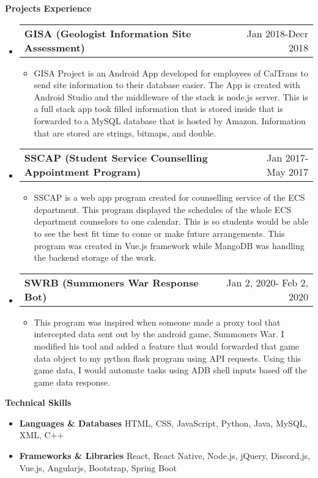 \documentclass[letterpaper,12pt]{article}[leftmargin=*]
\makeatletter
\def \entryspacing {-0pt}
\renewcommand{\section}[2]{\vspace{5pt}
  \colorbox{secondary}{\color{white}\raggedbottom\normalsize\textbf{{#1}{\hspace{7pt}#2}}}
}
\newcommand{\resumeEntryStart}{\begin{itemize}[leftmargin=2.5mm]}
\newcommand{\resumeEntryEnd}{\end{itemize}\vspace{\entryspacing}}
\newcommand{\resumeItemListStart}{\begin{itemize}[leftmargin=4.5mm]}
\newcommand{\resumeItemListEnd}{\end{itemize}}
\newcommand{\resumeItem}[1]{
  \item\small{
    {#1 \vspace{-2pt}}
  }
}
\newcommand{\resumeEntryTD}[2]{
  \vspace{-1pt}\item[]
    \begin{tabularx}{0.97\textwidth}{X@{\hspace{60pt}}r}
      \textbf{\color{primary}#1} & {\firabook\color{accent}\small#2} \\
    \end{tabularx}\vspace{-6pt}
}
\newcommand{\resumeEntryS}[2]{
  \item[]\small{
    \textbf{\color{primary}#1 }{ #2 \vspace{-6pt}}
  }
}
\makeatother
\begin{document}
\section{\faFlask}{Projects Experience}

  \resumeEntryStart
    \resumeEntryTD
      {GISA (Geologist Information Site Assessment)}{Jan 2018-Decr 2018}
    \resumeItemListStart
      \resumeItem {GISA Project is an Android App developed for employees of CalTrans to send site information to their database easier. The App is created with Android Studio and the middleware of the stack is node.js server. This is a full stack app took filled information that is stored inside that is forwarded to a MySQL database that is hosted by Amazon. Information that are stored are strings, bitmaps, and double.}
    \resumeItemListEnd
  \resumeEntryEnd

  \resumeEntryStart
    \resumeEntryTD
      {SSCAP (Student Service Counselling Appointment Program)}{Jan 2017- May 2017}
    \resumeItemListStart
      \resumeItem {SSCAP is a web app program created for counselling service of the ECS department. This program displayed the schedules of the whole ECS department counselors to one calendar. This is so students would be able to see the best fit time to come or make future arrangements. This program was created in Vue.js framework while MangoDB was handling the backend storage of the work. }
    \resumeItemListEnd
  \resumeEntryEnd

  \resumeEntryStart
    \resumeEntryTD
      {SWRB (Summoners War Response Bot)}{Jan 2, 2020- Feb 2, 2020}
    \resumeItemListStart
      \resumeItem {This program was inspired when someone made a proxy tool that intercepted data sent out by the android game, Summoners War. I modified his tool and added a feature that would forwarded that game data object to my python flask program using API requests. Using this game data, I would automate tasks using ADB shell inputs based off the game data response.}
    \resumeItemListEnd
  \resumeEntryEnd

\section{\faGears}{Technical Skills}
 \resumeEntryStart
  \resumeEntryS{Languages \& Databases } {HTML, CSS, JavaScript, Python, Java, MySQL, XML, C++}
  \resumeEntryS{Frameworks \& Libraries} {React, React Native, Node.js, jQuery, Discord.js, Vue.js, Angularjs, Bootstrap, Spring Boot}
 \resumeEntryEnd
\end{document}
